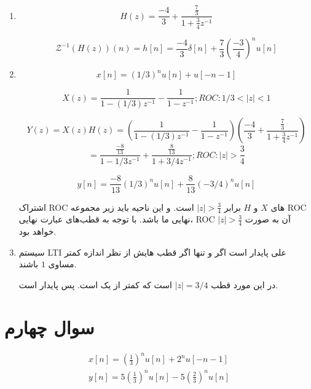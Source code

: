 \documentclass[12pt]{article}
\begin{document}
\begin{enumerate}[label = \Alph*)]
	\item 
	$$H(z) = \frac{-4}{3} + \frac{\frac{7}{3}}{1 + \frac{3}{4} z^{-1}}$$
	
	$$\mathcal{Z}^{-1}(H(z))(n) = h[n] = \frac{-4}{3} \delta[n] + \frac{7}{3} (\frac{-3}{4})^n u[n]$$ 
	
	\item
	
	$$x[n] = (1/3)^n u[n] + u[-n -1]$$
	
	$$X(z) = \frac{1}{1 - (1/3) z^{-1}} - \frac{1}{1 - z^{-1}}; ROC: 1/3<|z|<1$$
	
	$$Y(z) = X(z) H(z) = (\frac{1}{1 - (1/3) z^{-1}} - \frac{1}{1 - z^{-1}}) (\frac{-4}{3} + \frac{\frac{7}{3}}{1 + \frac{3}{4} z^{-1}})$$$$ = \frac{\frac{-8}{13}}{1 - 1/3 z^{-1}} + \frac{\frac{8}{13}}{1 + 3/4 z^{-1}} ; ROC:|z| > \frac{3}{4}$$
	

	
	$$y[n] = \frac{-8}{13} (1/3)^n u[n] + \frac{8}{13} (-3/4)^{n} u[n] $$
	
	
	اشتراک ROC های $X$ و $H$ برابر $|z|>\frac{3}{4}$ است. و این ناحیه باید زیر مجموعه ROC نهایی ما باشد. با توجه به قطب‌های عبارت نهایی، ROC آن به صورت $|z| > \frac{3}{4}$ خواهد بود.
	
	
	
	\item
	سیستم LTI علی پایدار است اگر و تنها اگر قطب هایش از نظر اندازه کمتر مساوی $1$ باشند.
	
	در این مورد قطب $|z| = 3/4$ است که کمتر از یک است. پس پایدار است.
	
	
	
\end{enumerate}



\section{سوال چهارم}
$$
\begin{array}{l}
	x[n]=\left(\frac{1}{3}\right)^{n} u[n]+2^{n} u[-n-1] \\
	y[n]=5\left(\frac{1}{3}\right)^{n} u[n]-5\left(\frac{2}{3}\right)^{n} u[n]
\end{array}
$$
\end{document}
